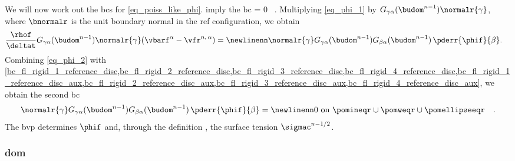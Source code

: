 \begin{enumerate}
{                We will now work out the \acp{bc} for \cref{eq_poiss_like_phi}.  imply the \ac{bc}
                \be
                \label{bc_phi_1}
                \phif = 0 \,  \pomouteqr.
                \ee
                Multiplying \cref{eq_phi_1} by $G_{\gamma \alpha}(\budom^{n-1}) \normalr{\gamma}$, where $\bnormalr$ is the unit boundary normal in the \ac{ref} configuration,  we obtain
                \begin{align}
                        \label{eq_phi_2}
                        \frac{\rhof}{\deltat} G_{\gamma \alpha}(\budom^{n-1}) \normalr{\gamma} (\vbarf^\alpha - \vfr^{n, \, \alpha}) & = \newlinenn
                        \normalr{\gamma} G_{\gamma \alpha}(\budom^{n-1})  G_{\beta \alpha}(\budom^{n-1})  \,          \pderr{ \phif   }{\beta }.
                \end{align}
                Combining \cref{eq_phi_2} with \cref{bc_fl_rigid_1_reference_disc,bc_fl_rigid_2_reference_disc,bc_fl_rigid_3_reference_disc,bc_fl_rigid_4_reference_disc,bc_fl_rigid_1_reference_disc_aux,bc_fl_rigid_2_reference_disc_aux,bc_fl_rigid_3_reference_disc_aux,bc_fl_rigid_4_reference_disc_aux}, we obtain the second \ac{bc}
                \begin{align}
                        \label{bc_phi_2}
                        \normalr{\gamma}  G_{\gamma \alpha}(\budom^{n-1})  G_{\beta \alpha}(\budom^{n-1}) \,          \pderr{ \phif   }{\beta } & = \newlinenn 0
                        \text{ on } \pomineqr \cup \pomweqr \cup \pomellipseeqr                                                                 & .
                \end{align}
                The \ac{bvp}  determines $\phif$ and, through the definition , the surface tension $\sigmac^{n-1/2}$.
        }
\end{enumerate}


\subsubsection{\Acl{dom}}

